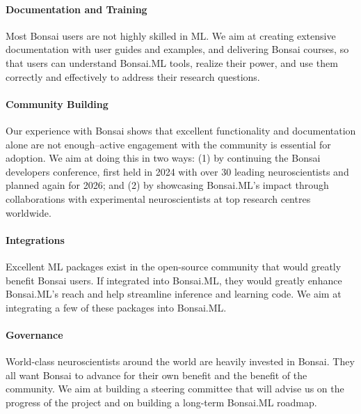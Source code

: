 
\paragraph{Documentation and Training} Most Bonsai users are not highly skilled
in ML. We aim at creating extensive documentation with user guides and examples, and delivering
Bonsai courses, so that users can understand Bonsai.ML tools, realize their
power, and use them correctly and effectively to address their research questions.

\paragraph{Community Building} Our experience with Bonsai shows that excellent
functionality and documentation alone are not enough--active engagement with the
community is essential for adoption. We aim at doing this in two ways: (1) by
continuing the Bonsai developers conference, first held in 2024 with over 30
leading neuroscientists and planned again for 2026; and (2) by showcasing
Bonsai.ML’s impact through collaborations with experimental neuroscientists at
top research centres worldwide.

\paragraph{Integrations} Excellent ML packages exist in the open-source
community that would greatly benefit Bonsai users. If integrated into Bonsai.ML, they would greatly enhance Bonsai.ML's reach and help streamline
inference and learning code. We aim at integrating a few of
these packages into Bonsai.ML.

\paragraph{Governance} World-class neuroscientists around the world are heavily
invested in Bonsai. They all want Bonsai to advance for their own benefit and
the benefit of the community. We aim at building a steering committee that will
advise us on the progress of the project and on building a long-term Bonsai.ML
roadmap.
